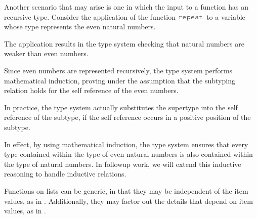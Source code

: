 \documentclass[table,dvipsnames,acmsmall]{acmart}
\theoremstyle{definition}
\begin{document}
Another scenario that may arise is one in which the input to a function has an recursive type.
Consider the application of the function $\J{repeat}$ to a variable whose type represents the even natural numbers.


\noindent
The application results in the type system checking that natural numbers are weaker than even numbers. 


\noindent
Since even numbers are represented recursively, the type system performs mathematical induction,
proving under the assumption that the subtyping relation holds for the self reference of the even numbers. 


\noindent
In practice, the type system actually substitutes the supertype into
the self reference of the subtype, if the self reference occurs in a positive position of the subtype.


\noindent
In effect, by using mathematical induction, the type system ensures that 
every type contained within the type of even natural numbers is also
contained within the type of natural numbers.
In followup work, we will extend this inductive reasoning to handle inductive relations. 

Functions on lists can be generic, in that they may be independent of the item values, as in .
Additionally, they may factor out the details that depend on item values, as in . 

\end{document}
